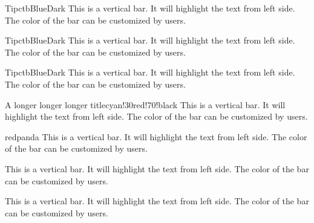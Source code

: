 \documentclass[11pt, letterpaper]{../src/simple_doc}
\begin{document}
    \begin{cbbar}{Tip}{ctbBlueDark}
        This is a vertical bar.
        It will highlight the text from left side.
        The color of the bar can be customized by users.
    \end{cbbar}

    \begin{cbbar}{Tip}{ctbBlueDark}
        This is a vertical bar.
        It will highlight the text from left side.
        The color of the bar can be customized by users.
    \end{cbbar}

    \begin{cbbar}{Tip}{ctbBlueDark}
        This is a vertical bar.
        It will highlight the text from left side.
        The color of the bar can be customized by users.
    \end{cbbar}

    \begin{cbcurvedtitle}{A longer longer longer title}{cyan!30}{red!70!black}
        This is a vertical bar.
        It will highlight the text from left side.
        The color of the bar can be customized by users.
    \end{cbcurvedtitle}

    \begin{cbpictitle}{red}{panda}
        This is a vertical bar.
        It will highlight the text from left side.
        The color of the bar can be customized by users.
    \end{cbpictitle}

    \begin{cbshadow}[red] %
        This is a vertical bar.
        It will highlight the text from left side.
        The color of the bar can be customized by users.
    \end{cbshadow}

    \begin{cbshadow}
        This is a vertical bar.
        It will highlight the text from left side.
        The color of the bar can be customized by users.
    \end{cbshadow}
\end{document}

